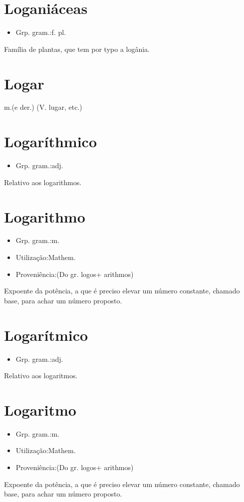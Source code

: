 \section{Loganiáceas}
\begin{itemize}
\item {Grp. gram.:f. pl.}
\end{itemize}
Família de plantas, que tem por typo a logânia.
\section{Logar}
\textunderscore m.\textunderscore  (e der.)
(V. \textunderscore lugar\textunderscore , etc.)
\section{Logaríthmico}
\begin{itemize}
\item {Grp. gram.:adj.}
\end{itemize}
Relativo aos logarithmos.
\section{Logarithmo}
\begin{itemize}
\item {Grp. gram.:m.}
\end{itemize}
\begin{itemize}
\item {Utilização:Mathem.}
\end{itemize}
\begin{itemize}
\item {Proveniência:(Do gr. \textunderscore logos\textunderscore  + \textunderscore arithmos\textunderscore )}
\end{itemize}
Expoente da potência, a que é preciso elevar um número constante, chamado base, para achar um número proposto.
\section{Logarítmico}
\begin{itemize}
\item {Grp. gram.:adj.}
\end{itemize}
Relativo aos logaritmos.
\section{Logaritmo}
\begin{itemize}
\item {Grp. gram.:m.}
\end{itemize}
\begin{itemize}
\item {Utilização:Mathem.}
\end{itemize}
\begin{itemize}
\item {Proveniência:(Do gr. \textunderscore logos\textunderscore  + \textunderscore arithmos\textunderscore )}
\end{itemize}
Expoente da potência, a que é preciso elevar um número constante, chamado base, para achar um número proposto.
